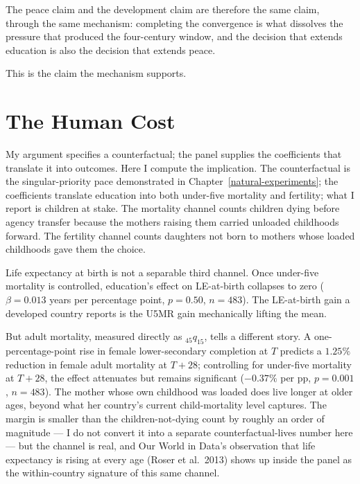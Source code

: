 \documentclass[12pt,letterpaper]{article}
\begin{document}
The peace claim and the development claim are therefore the same
claim, through the same mechanism: completing the convergence is what
dissolves the pressure that produced the four-century window, and the
decision that extends education is also the decision that extends
peace.

This is the claim the mechanism supports.

\section{The Human Cost}\label{the-human-cost}

My argument specifies a counterfactual; the panel supplies the
coefficients that translate it into outcomes. Here I compute the
implication. The counterfactual is the singular-priority pace
demonstrated in Chapter~\ref{natural-experiments}; the coefficients
translate education into both under-five mortality and fertility;
what I report is children at stake. The mortality channel counts
children dying before agency transfer because the mothers raising
them carried unloaded childhoods forward. The fertility channel
counts daughters not born to mothers whose loaded childhoods gave
them the choice.

Life expectancy at birth is not a separable third channel. Once
under-five mortality is controlled, education's effect on
LE-at-birth collapses to zero ($\beta = 0.013$ years per percentage
point, $p = 0.50$, $n = 483$). The LE-at-birth gain
a developed country reports is the U5MR gain mechanically lifting
the mean.

But adult mortality, measured directly as $_{45}q_{15}$, tells a
different story. A one-percentage-point rise in female
lower-secondary completion at $T$ predicts a $1.25\%$ reduction in
female adult mortality at $T{+}28$; controlling for under-five
mortality at $T{+}28$, the effect attenuates but remains significant
($-0.37\%$ per pp, $p = 0.001$, $n = 483$). The mother whose own
childhood was loaded does live longer at older ages, beyond what her
country's current child-mortality level captures. The margin is
smaller than the children-not-dying count by roughly an order of
magnitude --- I do not convert it into a separate
counterfactual-lives number here --- but the channel is real, and
Our World in Data's observation that life expectancy is rising at
every age (Roser et al.~2013) shows up inside the panel as the
within-country signature of this same channel.
\end{document}
